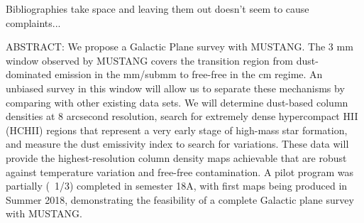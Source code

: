 \documentclass[11pt,preprint]{aastex_nofoot}
\newcommand{\MUSTANG}{\textsc{MUSTANG-2}\xspace}
\begin{document}
% 
% 
% 



\clearpage
{\color{red} Bibliographies take space and leaving them out doesn't seem to cause complaints...}
\footnotesize\raggedright
\noindent 
%

\normalsize
%


ABSTRACT:
We propose a Galactic Plane survey with MUSTANG.  The 3 mm window observed by
MUSTANG covers the transition region from dust-dominated emission in the
mm/submm to free-free in the cm regime.  An unbiased survey in this window will
allow us to separate these mechanisms by comparing with other existing data
sets.  We will determine dust-based column densities at 8 arcsecond
resolution,  search for extremely dense hypercompact HII (HCHII) regions that
represent a very early stage of high-mass star formation, and measure the
dust emissivity index to search for variations. These data will provide the
highest-resolution column density maps achievable that are robust against
temperature variation and free-free contamination.  A pilot program was
partially (~1/3) completed in semester 18A, with first maps being produced in
Summer 2018, demonstrating the feasibility of a complete Galactic plane survey
with MUSTANG.
\end{document}
